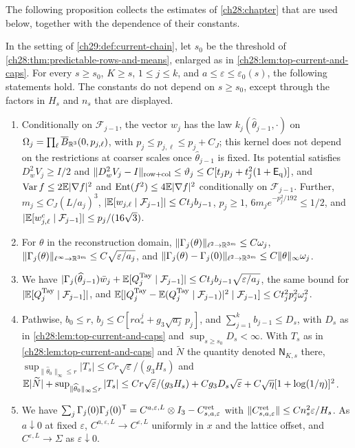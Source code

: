 The following proposition collects the estimates of \cref{ch28:chapter} that are used below, together with the dependence of their constants.

\begin{proposition}\label{ch29:prop:inputs}
In the setting of \cref{ch29:def:current-chain}, let $s_0$ be the threshold of \cref{ch28:thm:predictable-rows-and-means}, enlarged as in \cref{ch28:lem:top-current-and-caps}. For every $s\ge s_0$, $K\ge s$, $1\le j\le k$, and $a\le\varepsilon\le\varepsilon_0(s)$, the following statements hold. The constants do not depend on $s\ge s_0$, except through the factors in $H_s$ and $n_s$ that are displayed.
\begin{enumerate}
\item Conditionally on $\mathcal F_{j-1}$, the vector $w_j$ has the law $k_j(\widehat\theta_{j-1},\cdot)$ on $\Omega_j=\prod_\ell\overline B_{\mathbb R^3}(0,p_{j,\ell})$, with $p_j\le p_{j,\ell}\le p_j+C_J$; this kernel does not depend on the restrictions at coarser scales once $\widehat\theta_{j-1}$ is fixed. Its potential satisfies $D_w^2V_j\ge I/2$ and $\|D_w^2V_j-I\|_{\rm row+col}\le\vartheta_j\le C[t_jp_j+t_j^2(1+\mathsf E_{\rm q})]$, and $\operatorname{Var} f\le2\mathbb E|\nabla f|^2$ and $\operatorname{Ent}(f^2)\le4\mathbb E|\nabla f|^2$ conditionally on $\mathcal F_{j-1}$. Further, $m_j\le C_J(L/a_j)^3$, $|\mathbb E[w_{j,\ell}\mid\mathcal F_{j-1}]|\le Ct_jb_{j-1}$, $p_j\ge1$, $6m_je^{-p_j^2/192}\le1/2$, and $|\mathbb E[w_{j,\ell}^c\mid\mathcal F_{j-1}]|\le p_j/(16\sqrt3)$.
\item For $\theta$ in the reconstruction domain, $\|\Gamma_j(\theta)\|_{\ell^2\to\mathbb R^{3m}}\le C\omega_j$, $\|\Gamma_j(\theta)\|_{\ell^\infty\to\mathbb R^{3m}}\le C\sqrt{\varepsilon/a_j}$, and $\|\Gamma_j(\theta)-\Gamma_j(0)\|_{\ell^2\to\mathbb R^{3m}}\le C\|\theta\|_\infty\omega_j$.
\item We have $|\Gamma_j(\widehat\theta_{j-1})\bar w_j+\mathbb E[Q_j^{\rm Tay}\mid\mathcal F_{j-1}]|\le Ct_jb_{j-1}\sqrt{\varepsilon/a_j}$, the same bound for $|\mathbb E[Q_j^{\rm Tay}\mid\mathcal F_{j-1}]|$, and $\mathbb E[|Q_j^{\rm Tay}-\mathbb E(Q_j^{\rm Tay}\mid\mathcal F_{j-1})|^2\mid\mathcal F_{j-1}]\le Ct_j^2p_j^2\omega_j^2$.
\item Pathwise, $b_0\le r$, $b_j\le C[r\alpha_*^j+g_3\sqrt{a_j}\,p_j]$, and $\sum_{j=1}^kb_{j-1}\le D_s$, with $D_s$ as in \cref{ch28:lem:top-current-and-caps} and $\sup_{s\ge s_0}D_s<\infty$. With $T_s$ as in \cref{ch28:lem:top-current-and-caps} and $\widetilde N$ the quantity denoted $\mathsf N_{K,s}$ there, $\sup_{\|\widehat\theta_0\|_\infty\le r}|T_s|\le Cr\sqrt\varepsilon/(g_3H_s)$ and $\mathbb E|\widetilde N|+\sup_{\|\widehat\theta_0\|_\infty\le r}|T_s|\le Cr\sqrt\varepsilon/(g_3H_s)+Cg_3D_s\sqrt\varepsilon+C\sqrt\eta[1+\log(1/\eta)]^2$.
\item We have $\sum_j\Gamma_j(0)\Gamma_j(0)^{\mathsf T}=C^{a,\varepsilon,L}\otimes I_3-C^{\rm ret}_{s,a,\varepsilon}$ with $\|C^{\rm ret}_{s,a,\varepsilon}\|\le Cn_s^2\varepsilon/H_s$. As $a\downarrow0$ at fixed $\varepsilon$, $C^{a,\varepsilon,L}\to C^{\varepsilon,L}$ uniformly in $x$ and the lattice offset, and $C^{\varepsilon,L}\to\Sigma$ as $\varepsilon\downarrow0$.
\end{enumerate}
\end{proposition}

